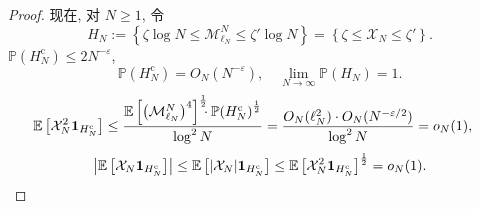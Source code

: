 \begin{proof}
{    }{
        现在, 对 $N\ge 1$, 令
    }
    \begin{equation*}
        H_N
        :=\left\{
            \zeta\log N\le \mathcal M^N_{\ell_N}\le \zeta'\log N
        \right\}
        =
        \left\{
            \zeta\le \mathcal X_N\le \zeta'
        \right\}.
    \end{equation*}
    $
        \mathbb P(
            H_N^{\mathrm c}
        )
        \le
        2N^{-\varepsilon}
    $,
    \begin{equation*}
        \mathbb P(
            H_N^{\mathrm c}
        )
        =
        O_N(N^{-\varepsilon}),
        \quad
        \lim_{N\to\infty}\mathbb P(H_N)=1.
    \end{equation*}
    \begin{align*}
        \mathbb E\left[
            \mathcal X_N^2
            {\bf 1}_{H_N^{\mathrm c}}
        \right]
        &
        \le
        \frac{
            \mathbb E\left[
                \left(
                    \mathcal M^N_{\ell_N}
                \right)^4
            \right]^{\frac 12}
            \!\!\!
            \cdot
            \mathbb P\!\left(
                H_N^{\mathrm c}
            \right)^{\frac 12}
        }{\log^2 N}
        =
        \frac{
            O_N(\ell_N^2)
            \cdot
            O_N(N^{-\varepsilon/2})
        }{\log^2 N}
        =
        o_N(1),
    \end{align*}
    \begin{equation*}
        \left|
            \mathbb E\left[
                \mathcal X_N
                {\bf 1}_{H_N^{\mathrm c}}
            \right]
        \right|
        \le
        \mathbb E\left[
            |\mathcal X_N|
            {\bf 1}_{H_N^{\mathrm c}}
        \right]
        \le
        \mathbb E\left[
            \mathcal X_N^2
            {\bf 1}_{H_N^{\mathrm c}}
        \right]^{\frac 12}
        =
        o_N(1).
    \end{equation*}

\end{proof}
